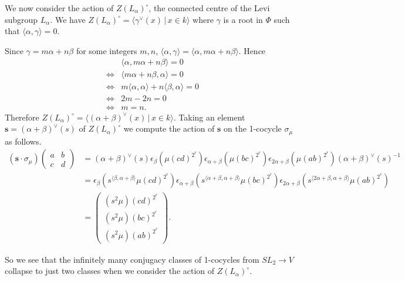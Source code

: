 We now consider the action of $Z(L_\alpha)^\circ$, the connected centre of the Levi subgroup $L_\alpha$. We have $Z(L_\alpha)^\circ = \langle \gamma^\vee(x)\,|\,x \in k \rangle$ where $\gamma$ is a root in $\Phi$ such that $\langle \alpha, \gamma \rangle = 0$.

Since $\gamma = m\alpha + n\beta$ for some integers $m,n$, $\langle \alpha, \gamma \rangle = \langle \alpha, m\alpha + n\beta \rangle$. Hence
\begin{align*}
&\langle \alpha, m\alpha + n\beta \rangle = 0 \\
\Leftrightarrow &\langle m\alpha + n\beta, \alpha \rangle = 0 \\
\Leftrightarrow &m\langle \alpha, \alpha \rangle + n \langle \beta, \alpha\rangle = 0 \\
\Leftrightarrow &2m - 2n = 0 \\
\Leftrightarrow &m = n.
\end{align*}
Therefore $Z(L_ \alpha)^\circ = \langle (\alpha + \beta)^\vee(x)\,|\,x \in k \rangle$. Taking an element $\mathbf{s} = (\alpha + \beta)^\vee(s)$ of $Z(L_\alpha)^\circ$ we compute the action of $\mathbf{s}$ on the 1-cocycle $\sigma_\mu$ as follows.
\begin{align*}
\left(\mathbf{s}\cdot \sigma_\mu\right)
\left(\begin{matrix} a & b \\ c & d\end{matrix} \right) 
&=
(\alpha + \beta)^\vee(s) \epsilon_\beta \left(\mu (cd)^{2^r} \right)\epsilon_{\alpha+\beta} \left(\mu(bc)^{2^r} \right)\epsilon_{2\alpha + \beta} \left(\mu(ab)^{2^r} \right)(\alpha + \beta)^\vee(s)^{-1}\\
&=  \epsilon_\beta\left(s^{\langle\beta , \alpha+\beta\rangle}\mu (cd)^{2^r} \right)\epsilon_{\alpha+\beta} \left(s^{\langle \alpha+\beta, \alpha+\beta \rangle} \mu(bc)^{2^r} \right)\epsilon_{2\alpha + \beta} \left(s^{\langle 2\alpha+\beta, \alpha+\beta\rangle}\mu(ab)^{2^r}\right) \\
&=
\left(\begin{matrix}
(s^2\mu)(cd)^{2^r} \\
(s^2\mu)(bc)^{2^r} \\
(s^2\mu)(ab)^{2^r}
\end{matrix}\right).
\end{align*}

So we see that the infinitely many conjugacy classes of 1-cocycles from $SL_2\rightarrow V$ collapse to just two classes when we consider the action of $Z(L_\alpha)^\circ$.

